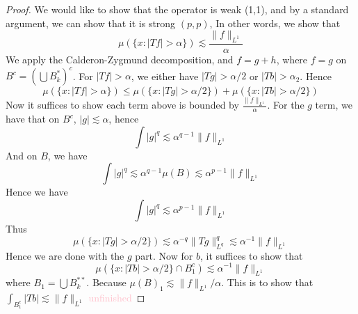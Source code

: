 \begin{proof}
    We would like to show that the operator is weak (1,1), and by a standard argument, we can show that it is strong $(p,p)$, In other words, we show that 
    \begin{equation*}
        \mu\left(\{x: |Tf|>\alpha\}\right)\lesssim\frac{\|f\|_{L^1}}{\alpha}
    \end{equation*}
    We apply the Calderon-Zygmund decomposition, and $f=g+h$, where $f=g$ on $B^c=\left(\bigcup B_k^*\right)^c$. For $|Tf|>\alpha$, we either have $|Tg|>\alpha/2$ or $|Tb|>\alpha_2$. Hence 
    \begin{equation*}
        \mu\left(\{x: |Tf|>\alpha\}\right)\leq\mu(\{x: |Tg|>\alpha/2\})+\mu(\{x: |Tb|>\alpha/2\})
    \end{equation*}
    Now it suffices to show each term above is bounded by $\frac{\|f\|_{L^1}}{\alpha}$. For the $g$ term, we have that on $B^c$, $|g|\lesssim\alpha$, hence 
    \begin{equation*}
        \int|g|^q\lesssim\alpha^{q-1}\|f\|_{L^1}
    \end{equation*}
    And on $B$, we have 
    \begin{equation*}
        \int|g|^q\lesssim\alpha^{q-1}\mu(B)\lesssim \alpha^{p-1}\|f\|_{L^1}
    \end{equation*}
    Hence we have 
    \begin{equation*}
        \int|g|^q\lesssim \alpha^{p-1}\|f\|_{L^1}
    \end{equation*}
    Thus
    \begin{equation*}
        \mu(\{x: |Tg|>\alpha/2\})\lesssim\alpha^{-q}\|Tg\|_{L^q}^q\lesssim\alpha^{-1}\|f\|_{L^1}
    \end{equation*}
    Hence we are done with the $g$ part. Now for $b$, it suffices to show that 
    \begin{equation*}
        \mu(\{x: |Tb|>\alpha/2\}\cap B_1^c)\lesssim \alpha^{-1}\|f\|_{L^1}
    \end{equation*}
    where $B_1=\bigcup B_k^{**}$. Because $\mu(B)_1\lesssim\|f\|_{L^1}/\alpha$. This is to show that $
        \int_{B_1^c}|Tb|\lesssim\|f\|_{L^1}$
    \textcolor{pink}{unfinished}
\end{proof}

